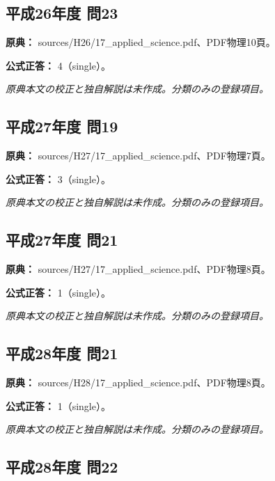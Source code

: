 \subsection{平成26年度 問23}
\label{q:h26-reg-applied-23}

\noindent\textbf{原典：} sources/H26/17\_applied\_science.pdf、PDF物理10頁。

\textbf{公式正答：} 4（single）。

\par\textit{原典本文の校正と独自解説は未作成。分類のみの登録項目。}

\subsection{平成27年度 問19}
\label{q:h27-reg-applied-19}

\noindent\textbf{原典：} sources/H27/17\_applied\_science.pdf、PDF物理7頁。

\textbf{公式正答：} 3（single）。

\par\textit{原典本文の校正と独自解説は未作成。分類のみの登録項目。}

\subsection{平成27年度 問21}
\label{q:h27-reg-applied-21}

\noindent\textbf{原典：} sources/H27/17\_applied\_science.pdf、PDF物理8頁。

\textbf{公式正答：} 1（single）。

\par\textit{原典本文の校正と独自解説は未作成。分類のみの登録項目。}

\subsection{平成28年度 問21}
\label{q:h28-reg-applied-21}

\noindent\textbf{原典：} sources/H28/17\_applied\_science.pdf、PDF物理8頁。

\textbf{公式正答：} 1（single）。

\par\textit{原典本文の校正と独自解説は未作成。分類のみの登録項目。}

\subsection{平成28年度 問22}
\label{q:h28-reg-applied-22}

